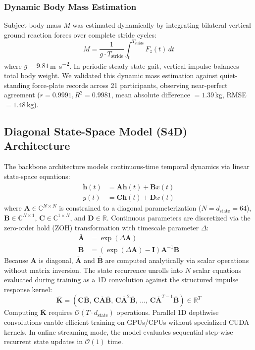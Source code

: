 \documentclass[fleqn,10pt]{wlscirep}
\newcommand{\Kbar}{\bar{\mathbf{K}}}
\newcommand{\Abar}{\bar{\mathbf{A}}}
\newcommand{\Bbar}{\bar{\mathbf{B}}}
\newcommand{\dstate}{d_{\mathrm{state}}}
\begin{document}
\subsubsection{Dynamic Body Mass Estimation}
Subject body mass $M$ was estimated dynamically by integrating bilateral vertical ground reaction forces over complete stride cycles:
\begin{equation}
M = \frac{1}{g \cdot T_{\mathrm{stride}}} \int_0^{T_{\mathrm{stride}}} F_z(t) \, dt
\label{eq:mass}
\end{equation}
where $g = 9.81$\,\si{\metre\per\second\squared}. In periodic steady-state gait, vertical impulse balances total body weight. We validated this dynamic mass estimation against quiet-standing force-plate records across 21 participants, observing near-perfect agreement ($r = 0.9991, R^2 = 0.9981$, mean absolute difference $= 1.39$\,\si{\kilogram}, RMSE $= 1.48$\,\si{\kilogram}).

\subsection{Diagonal State-Space Model (S4D) Architecture}

The backbone architecture models continuous-time temporal dynamics via linear state-space equations:
\begin{align}
\dot{\mathbf{h}}(t) &= \mathbf{A} \mathbf{h}(t) + \mathbf{B} x(t) \label{eq:ssm_h} \\
y(t) &= \mathbf{C} \mathbf{h}(t) + \mathbf{D} x(t) \label{eq:ssm_y}
\end{align}
where $\mathbf{A} \in \mathbb{C}^{N \times N}$ is constrained to a diagonal parameterization ($N = \dstate = 64$), $\mathbf{B} \in \mathbb{C}^{N \times 1}$, $\mathbf{C} \in \mathbb{C}^{1 \times N}$, and $\mathbf{D} \in \mathbb{R}$. Continuous parameters are discretized via the zero-order hold (ZOH) transformation with timescale parameter $\Delta$:
\begin{align}
\Abar &= \exp(\Delta \mathbf{A}) \label{eq:zoh_a} \\
\Bbar &= (\exp(\Delta \mathbf{A}) - \mathbf{I}) \mathbf{A}^{-1} \mathbf{B} \label{eq:zoh_b}
\end{align}
Because $\mathbf{A}$ is diagonal, $\Abar$ and $\Bbar$ are computed analytically via scalar operations without matrix inversion. The state recurrence unrolls into $N$ scalar equations evaluated during training as a 1D convolution against the structured impulse response kernel:
\begin{equation}
\Kbar = \left(\mathbf{C}\Bbar,\, \mathbf{C}\Abar\Bbar,\, \mathbf{C}\Abar^2\Bbar,\, \dots,\, \mathbf{C}\Abar^{T-1}\Bbar\right) \in \mathbb{R}^T
\label{eq:kernel}
\end{equation}
Computing $\Kbar$ requires $\mathcal{O}(T \cdot \dstate)$ operations. Parallel 1D depthwise convolutions enable efficient training on GPUs/CPUs without specialized CUDA kernels. In online streaming mode, the model evaluates sequential step-wise recurrent state updates in $\mathcal{O}(1)$ time.
\end{document}
